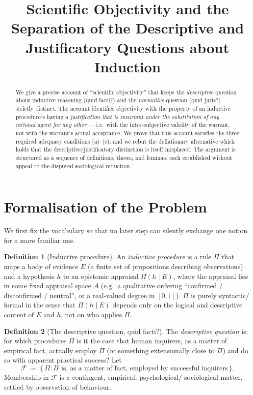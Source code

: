 \documentclass{amsart}
\theoremstyle{definition}
\newtheorem{definition}{Definition}
\theoremstyle{plain}
\begin{document}
\title{Scientific Objectivity and the Separation of the Descriptive and
Justificatory Questions about Induction}
\maketitle

\begin{abstract}
We give a precise account of ``scientific objectivity'' that keeps the
\emph{descriptive} question about inductive reasoning (quid facti?) and the
\emph{normative} question (quid juris?) strictly distinct. The account
identifies objectivity with the property of an inductive procedure's having a
\emph{justification that is invariant under the substitution of any rational
agent for any other} --- i.e.\ with the inter-subjective validity of the
warrant, not with the warrant's actual acceptance. We prove that this account
satisfies the three required adequacy conditions (a)--(c), and we rebut the
deflationary alternative which holds that the descriptive/justificatory
distinction is itself misplaced. The argument is structured as a sequence of
definitions, theses, and lemmas, each established without appeal to the
disputed sociological reduction.
\end{abstract}

\section{Formalisation of the Problem}

We first fix the vocabulary so that no later step can silently exchange one
notion for a more familiar one.

\begin{definition}[Inductive procedure]\label{def:procedure}
An \emph{inductive procedure} is a rule $\Pi$ that maps a body of evidence $E$
(a finite set of propositions describing observations) and a hypothesis $h$ to
an epistemic appraisal $\Pi(h \mid E)$, where the appraisal lies in some fixed
appraisal space $A$ (e.g.\ a qualitative ordering ``confirmed / disconfirmed /
neutral'', or a real-valued degree in $[0,1]$). $\Pi$ is purely syntactic\slash
formal in the sense that $\Pi(h\mid E)$ depends only on the logical and
descriptive content of $E$ and $h$, not on who applies $\Pi$.
\end{definition}

\begin{definition}[The descriptive question, quid facti?]\label{def:facti}
The \emph{descriptive question} is: for which procedures $\Pi$ is it the case
that human inquirers, as a matter of empirical fact, actually employ $\Pi$ (or
something extensionally close to $\Pi$) and do so with apparent practical
success? Let
\[
\mathcal{F} \;=\; \{\,\Pi : \Pi \text{ is, as a matter of fact, employed by
successful inquirers}\,\}.
\]
Membership in $\mathcal{F}$ is a contingent, empirical, psychological\slash
sociological matter, settled by observation of behaviour.
\end{definition}
\end{document}
